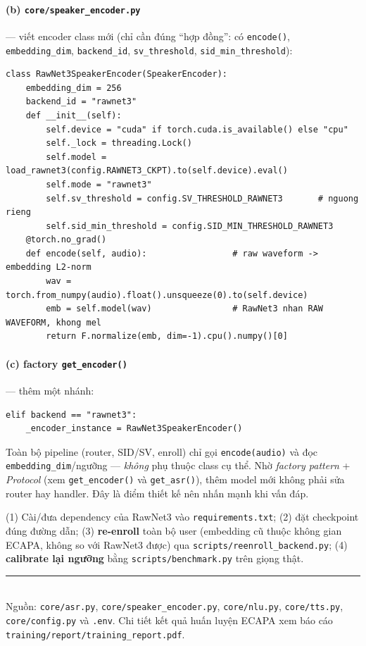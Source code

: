 \documentclass[12pt,a4paper]{article}
\begin{document}
\paragraph{(b) \texttt{core/speaker\_encoder.py}} --- viết encoder class mới (chỉ
cần đúng ``hợp đồng'': có \texttt{encode()}, \texttt{embedding\_dim},
\texttt{backend\_id}, \texttt{sv\_threshold}, \texttt{sid\_min\_threshold}):
\begin{lstlisting}
class RawNet3SpeakerEncoder(SpeakerEncoder):
    embedding_dim = 256
    backend_id = "rawnet3"
    def __init__(self):
        self.device = "cuda" if torch.cuda.is_available() else "cpu"
        self._lock = threading.Lock()
        self.model = load_rawnet3(config.RAWNET3_CKPT).to(self.device).eval()
        self.mode = "rawnet3"
        self.sv_threshold = config.SV_THRESHOLD_RAWNET3       # nguong rieng
        self.sid_min_threshold = config.SID_MIN_THRESHOLD_RAWNET3
    @torch.no_grad()
    def encode(self, audio):                 # raw waveform -> embedding L2-norm
        wav = torch.from_numpy(audio).float().unsqueeze(0).to(self.device)
        emb = self.model(wav)                # RawNet3 nhan RAW WAVEFORM, khong mel
        return F.normalize(emb, dim=-1).cpu().numpy()[0]
\end{lstlisting}

\paragraph{(c) factory \texttt{get\_encoder()}} --- thêm một nhánh:
\begin{lstlisting}
elif backend == "rawnet3":
    _encoder_instance = RawNet3SpeakerEncoder()
\end{lstlisting}

\begin{diembox}
Toàn bộ pipeline (router, SID/SV, enroll) chỉ gọi \texttt{encode(audio)} và đọc
\texttt{embedding\_dim}/ngưỡng --- \emph{không} phụ thuộc class cụ thể. Nhờ
\emph{factory pattern} + \emph{Protocol} (xem \texttt{get\_encoder()} và
\texttt{get\_asr()}), thêm model mới không phải sửa router hay handler. Đây là điểm
thiết kế nên nhấn mạnh khi vấn đáp.
\end{diembox}

\begin{luuybox}
(1) Cài/đưa dependency của RawNet3 vào \texttt{requirements.txt}; (2) đặt checkpoint
đúng đường dẫn; (3) \textbf{re-enroll} toàn bộ user (embedding cũ thuộc không gian
ECAPA, không so với RawNet3 được) qua \texttt{scripts/reenroll\_backend.py}; (4)
\textbf{calibrate lại ngưỡng} bằng \texttt{scripts/benchmark.py} trên giọng thật.
\end{luuybox}

\vfill
\noindent\rule{\linewidth}{0.4pt}\\
\small Nguồn: \texttt{core/asr.py}, \texttt{core/speaker\_encoder.py},
\texttt{core/nlu.py}, \texttt{core/tts.py}, \texttt{core/config.py} và \texttt{.env}.
Chi tiết kết quả huấn luyện ECAPA xem báo cáo \texttt{training/report/training\_report.pdf}.
\end{document}
